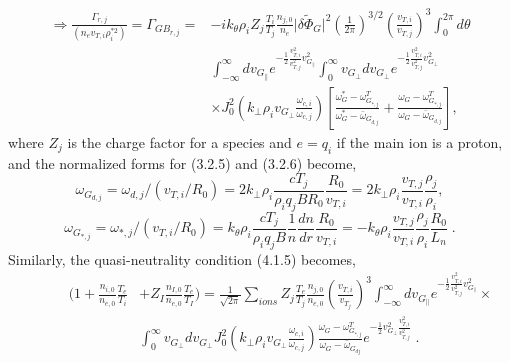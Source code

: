 \documentclass[12pt]{article}
\numberwithin{equation}{subsection}
\begin{document}
   \begin{equation}
   \begin{aligned}
      \Rightarrow    \frac{\Gamma_{r,j}}{(n_ev_{T,i}\rho_i^{*2})} = \Gamma_{GB_{r,j}} =
                    &-ik_\theta\rho_iZ_j\frac{T_i}{T_j}\frac{n_{j,0}}{n_e}\lvert\delta\widetilde{\Phi}_G\rvert^2
                     \left(\frac{1}{2\pi}\right)^{3/2}\left(\frac{v_{T,i}}{v_{T,j}}\right)^3\int_{0}^{2\pi}d\theta \\
                    &\int_{-\infty}^{\infty}dv_{G_\parallel}e^{-\frac{1}{2}\frac{v_{T,i}^2}{v_{T,j}^2}{v_{G_\parallel}^2}}
                     \int_{0}^{\infty}v_{G_\perp}dv_{G_\perp}e^{-\frac{1}{2}\frac{v_{T,i}^2}{v_{T,j}^2}v_{G_\perp}^2} \\
                    &\times J_0^2(k_\perp\rho_iv_{G_\perp}\frac{\omega_{c,i}}{\omega_{c,j}})
                     [\frac{\omega_G^*-\omega^T_{G_{*,j}}}{\omega_G^*-\bar{\omega}_{G_{d,j}}}
                     + \frac{\omega_G-\omega^T_{G_{*,j}}}{\omega_G-\bar{\omega}_{G_{d,j}}}],
   \end{aligned}
   \end{equation}
where $Z_j$ is the charge factor for a species and $e=q_i$ if the main ion is a proton, and the normalized forms for (3.2.5) and (3.2.6) become,
   \begin{equation}
      \omega_{G_{d,j}} = \omega_{d,j}/(v_{T,i}/R_0) = 2k_\perp\rho_i\frac{cT_j}{\rho_iq_jBR_0}\frac{R_0}{v_{T,i}} =
                         2k_\perp\rho_i\frac{v_{T,j}}{v_{T,i}}\frac{\rho_j}{\rho_i},
   \end{equation}
   \begin{equation}
      \omega_{G_{*,j}} = \omega_{*,j}/(v_{T,i}/R_0) = k_\theta\rho_i\frac{cT_j}{\rho_iq_jB}\frac{1}{n}\frac{dn}{dr}\frac{R_0}{v_{T,i}}
                       = -k_\theta\rho_i\frac{v_{T,j}}{v_{T,i}}\frac{\rho_j}{\rho_i}\frac{R_0}{L_n}\;.
   \end{equation}
Similarly, the quasi-neutrality condition (4.1.5) becomes,
   \begin{equation}
   \begin{aligned}
       \quad\quad\quad(1 + \frac{n_{i,0}}{n_{e,0}}\frac{T_e}{T_i} 
      &+ Z_I\frac{n_{I,0}}{n_{e,0}}\frac{T_e}{T_I}) =
       \frac{1}{\sqrt{2\pi}}\sum\limits_{ions}Z_j\frac{T_e}{T_j}\frac{n_{j,0}}{n_{e,0}}\left(\frac{v_{T,i}}{v_{T_j}}\right)^{3}
       \int_{-\infty}^{\infty}dv_{G_\parallel}e^{-\frac{1}{2}\frac{v^2_{T,i}}{v^2_{T,j}}v_{G_\parallel}^2}\times \\
      &\int_{0}^{\infty}v_{G_\perp} dv_{G_\perp} J_0^2(k_\perp\rho_i v_{G_\perp}\frac{\omega_{c,i}}{\omega_{c,j}})
       \frac{\omega_G - \omega_{G_{*,j}}^T}{\omega_G - \bar{\omega}_{G_{dj}}}e^{-\frac{1}{2}v_{G_\perp}^2\frac{v_{T,i}^2}{v_{T,j}^2}}\;.
   \end{aligned}
   \end{equation}
\end{document}
